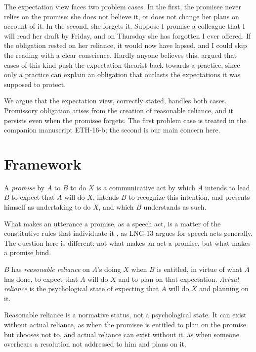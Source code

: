 \documentclass{situationist-preprint}
\begin{document}
The expectation view faces two problem cases. In the first, the promisee never relies on the promise: she does not believe it, or does not change her plans on account of it. In the second, she forgets it. Suppose I promise a colleague that I will read her draft by Friday, and on Thursday she has forgotten I ever offered. If the obligation rested on her reliance, it would now have lapsed, and I could skip the reading with a clear conscience. Hardly anyone believes this. \citet{KolodnyWallace2003} argued that cases of this kind push the expectation theorist back towards a practice, since only a practice can explain an obligation that outlasts the expectations it was supposed to protect.

We argue that the expectation view, correctly stated, handles both cases. Promissory obligation arises from the creation of reasonable reliance, and it persists even when the promisee forgets. The first problem case is treated in the companion manuscript ETH-16-b; the second is our main concern here.

\section{Framework}

\begin{definition}[Promise]\label{d:promise}
A \emph{promise} by $A$ to $B$ to do $X$ is a communicative act by which $A$ intends to lead $B$ to expect that $A$ will do $X$, intends $B$ to recognize this intention, and presents himself as undertaking to do $X$, and which $B$ understands as such.
\end{definition}

What makes an utterance a promise, as a speech act, is a matter of the constitutive rules that individuate it \citep{Searle1969}, as LNG-13 argues for speech acts generally. The question here is different: not what makes an act a promise, but what makes a promise bind.

\begin{definition}\label{d:reasonable}
$B$ has \emph{reasonable reliance} on $A$'s doing $X$ when $B$ is entitled, in virtue of what $A$ has done, to expect that $A$ will do $X$ and to plan on that expectation. \emph{Actual reliance} is the psychological state of expecting that $A$ will do $X$ and planning on it.
\end{definition}

Reasonable reliance is a normative status, not a psychological state. It can exist without actual reliance, as when the promisee is entitled to plan on the promise but chooses not to, and actual reliance can exist without it, as when someone overhears a resolution not addressed to him and plans on it.
\end{document}
